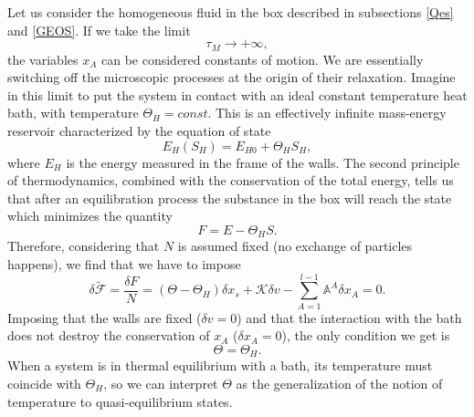 \documentclass[useAMS,usenatbib,prd,twocolumn,nofootinbib]{revtex4-1}
\begin{document}
Let us consider the homogeneous fluid in the box described in subsections \ref{Qes} and \ref{GEOS}. If we take the limit
\begin{equation}
\tau_M \longrightarrow + \infty ,
\end{equation}
the variables $x_A$ can be considered constants of motion. We are essentially switching off the microscopic processes at the origin of their relaxation. Imagine in this limit to put the system in contact with an ideal constant temperature heat bath, with temperature $\Theta_H=const$. This is an effectively infinite mass-energy reservoir characterized by the equation of state
\begin{equation}
E_H (S_H) = E_{H0} + \Theta_H S_H,
\end{equation}
where $E_H$ is the energy measured in the frame of the walls. The second principle of thermodynamics, combined with the conservation of the total energy, tells us that after an equilibration process the substance in the box will reach the state which minimizes the quantity
\begin{equation}\label{dacapoancoraallinizio}
F = E - \Theta_H S.
\end{equation}
Therefore, considering that $N$ is assumed fixed (no exchange of particles happens), we find that we have to impose 
\begin{equation}
\delta \tilde{\mathcal{F}} = \dfrac{\delta F}{N} = (\Theta - \Theta_H)\delta x_s + \mathcal{K} \delta v  - \sum_{A=1}^{l-1} \mathbb{A}^A \delta x_A =0.
\end{equation} 
Imposing that the walls are fixed ($\delta v =0$) and that the interaction with the bath does not destroy the conservation of $x_A$ ($\delta x_A =0$), the only condition we get is
\begin{equation}
\Theta = \Theta_H .
\end{equation}
When a system is in thermal equilibrium with a bath, its temperature must coincide with $\Theta_H$, so we can interpret $\Theta$ as the generalization of the notion of temperature to quasi-equilibrium states. 
\end{document}
